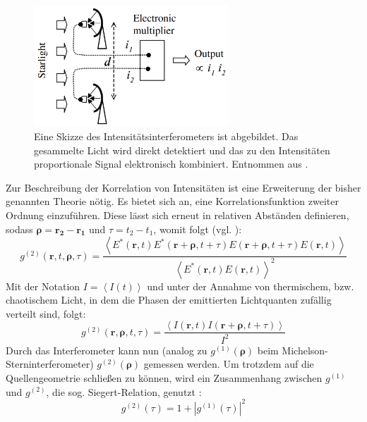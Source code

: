 \begin{figure}[h]
    \centering
    \includegraphics[width=0.65\textwidth]{images/Theorie/Fox_6.1b.png}
    \caption{Eine Skizze des Intensitätsinterferometers ist abgebildet. Das gesammelte Licht wird direkt detektiert und das zu den Intensitäten proportionale Signal elektronisch kombiniert. Entnommen aus \cite[Fig. 6.1]{foxQuantumOpticsIntroduction2006}.}
    \label{fig:Intensitätsinterferometer}
\end{figure}
Zur Beschreibung der Korrelation von Intensitäten ist eine Erweiterung der bisher genannten Theorie nötig. 
Es bietet sich an, eine Korrelationsfunktion zweiter Ordnung einzuführen. 
Diese lässt sich erneut in relativen Abständen definieren, sodass $\bm{\rho} = \mathbf{r_2} - \mathbf{r_1}$ und $\tau = t_2 - t_1$, womit folgt (vgl. \cite{foellmiIntensityInterferometrySecondorder2009}):
\begin{equation}
    g^{(2)}(\mathbf{r}, t, \bm{\rho}, \tau) = \frac{\left<E^*(\mathbf{r}, t)E^*(\mathbf{r}+\bm{\rho}, t+\tau)E(\mathbf{r}+\bm{\rho}, t+\tau)E(\mathbf{r}, t)\right>}
        {\left<E^*(\mathbf{r}, t)E(\mathbf{r}, t)\right>^2}
\end{equation}
Mit der Notation $I=\left<I(t)\right>$ und unter der Annahme von thermischem, bzw. chaotischem Licht, in dem die Phasen der emittierten Lichtquanten zufällig verteilt sind, folgt:
\begin{equation}
    g^{(2)}(\mathbf{r}, \bm{\rho}, t, \tau) =  \frac{\left<I(\mathbf{r}, t) I(\mathbf{r}+\bm{\rho}, t+\tau)\right>}{I^2}
    \label{eq:g2_final}
\end{equation}
Durch das Interferometer kann nun (analog zu $g^{(1)}(\bm{\rho})$ beim Michelson-Sterninterferometer) $g^{(2)}(\bm{\rho})$ gemessen werden. 
Um trotzdem auf die Quellengeometrie schließen zu können, wird ein Zusammenhang zwischen $g^{(1)}$ und $g^{(2)}$, die sog. Siegert-Relation, genutzt \cite{lasseguesFieldIntensityCorrelations2022}:
\begin{equation}
    g^{(2)}(\tau) = 1+ \left|g^{(1)}(\tau)\right|^2
\end{equation}
